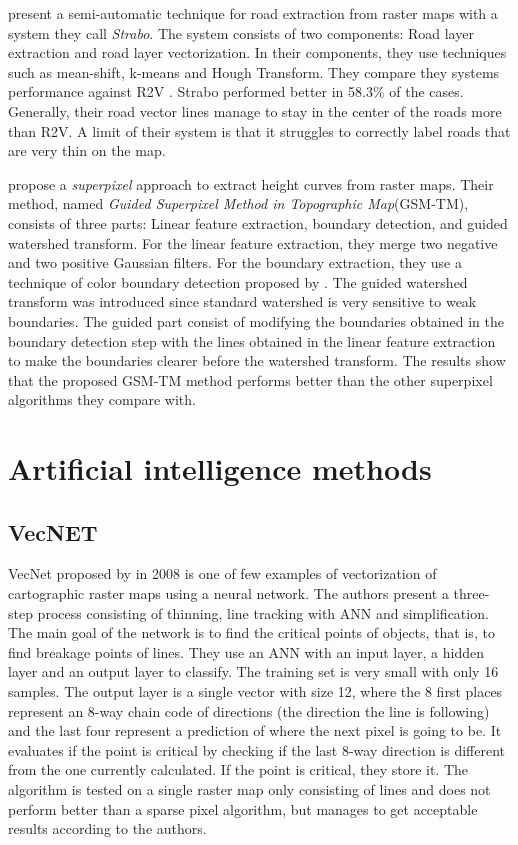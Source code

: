 \citeauthor{Chiang2013}\cite{Chiang2013} present a semi-automatic technique for road extraction from raster maps with a system they call \emph{Strabo}. The system consists of two components: Road layer extraction and road layer vectorization. In their components, they use techniques such as mean-shift, k-means and Hough Transform. They compare they systems performance against R2V \cite{Wu1999}. Strabo performed better in 58.3\% of the cases. Generally, their road vector lines manage to stay in the center of the roads more than R2V. A limit of their system is that it struggles to correctly label roads that are very thin on the map.

\citeauthor{Miao2016}\cite{Miao2016} propose a \emph{superpixel}\cite{Ren2003} approach to extract height curves from raster maps. Their method, named \emph{Guided Superpixel Method in Topographic Map}(GSM-TM), consists of three parts: Linear feature extraction, boundary detection, and guided watershed transform. For the linear feature extraction, they merge two negative and two positive Gaussian filters. For the boundary extraction, they use a technique of color boundary detection proposed by \citeauthor{Yang2013}\cite{Yang2013}. The guided watershed transform was introduced since standard watershed is very sensitive to weak boundaries. The guided part consist of modifying the boundaries obtained in the boundary detection step with the lines obtained in the linear feature extraction to make the boundaries clearer before the watershed transform. The results show that the proposed GSM-TM method performs better than the other superpixel algorithms they compare with.




\section{Artificial intelligence methods}

\subsection{VecNET}
VecNet proposed by \citeauthor{Karabork2008} in 2008 is one of few examples of vectorization of cartographic raster maps using a neural network. The authors present a three-step process consisting of thinning, line tracking with ANN and simplification. The main goal of the network is to find the critical points of objects, that is, to find breakage points of lines. They use an ANN with an input layer, a hidden layer and an output layer to classify. The training set is very small with only 16 samples. The output layer is a single vector with size 12, where the 8 first places represent an 8-way chain code of directions (the direction the line is following) and the last four represent a prediction of where the next pixel is going to be. It evaluates if the point is critical by checking if the last 8-way direction is different from the one currently calculated. If the point is critical, they store it. The algorithm is tested on a single raster map only consisting of lines and does not perform better than a sparse pixel algorithm, but manages to get acceptable results according to the authors.

